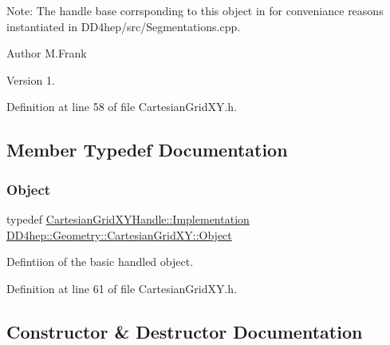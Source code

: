 Note\+: The handle base corrsponding to this object in for conveniance reasons instantiated in D\+D4hep/src/\+Segmentations.\+cpp.

\begin{DoxyAuthor}{Author}
M.\+Frank 
\end{DoxyAuthor}
\begin{DoxyVersion}{Version}
1. 
\end{DoxyVersion}


Definition at line 58 of file Cartesian\+Grid\+X\+Y.\+h.



\subsection{Member Typedef Documentation}
\hypertarget{class_d_d4hep_1_1_geometry_1_1_cartesian_grid_x_y_ab59ffe7391d8eb8e0b922e7965272808}{}\label{class_d_d4hep_1_1_geometry_1_1_cartesian_grid_x_y_ab59ffe7391d8eb8e0b922e7965272808} 
\subsubsection{\texorpdfstring{Object}{Object}}
{\footnotesize\ttfamily typedef \hyperlink{class_d_d4hep_1_1_handle_ad7ff728a25806079516b8965b9113f1a}{Cartesian\+Grid\+X\+Y\+Handle\+::\+Implementation} \hyperlink{class_d_d4hep_1_1_geometry_1_1_cartesian_grid_x_y_ab59ffe7391d8eb8e0b922e7965272808}{D\+D4hep\+::\+Geometry\+::\+Cartesian\+Grid\+X\+Y\+::\+Object}}



Defintiion of the basic handled object. 



Definition at line 61 of file Cartesian\+Grid\+X\+Y.\+h.



\subsection{Constructor \& Destructor Documentation}
\hypertarget{class_d_d4hep_1_1_geometry_1_1_cartesian_grid_x_y_a12eced6e1ac9a7679039debd4246004e}{}\label{class_d_d4hep_1_1_geometry_1_1_cartesian_grid_x_y_a12eced6e1ac9a7679039debd4246004e} 
